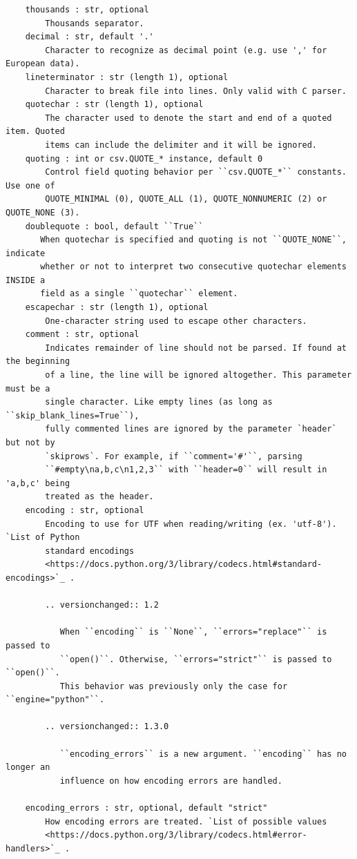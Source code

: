 \documentclass[
  letterpaper,
]{book}
\begin{document}
\begin{verbatim}
    thousands : str, optional
        Thousands separator.
    decimal : str, default '.'
        Character to recognize as decimal point (e.g. use ',' for European data).
    lineterminator : str (length 1), optional
        Character to break file into lines. Only valid with C parser.
    quotechar : str (length 1), optional
        The character used to denote the start and end of a quoted item. Quoted
        items can include the delimiter and it will be ignored.
    quoting : int or csv.QUOTE_* instance, default 0
        Control field quoting behavior per ``csv.QUOTE_*`` constants. Use one of
        QUOTE_MINIMAL (0), QUOTE_ALL (1), QUOTE_NONNUMERIC (2) or QUOTE_NONE (3).
    doublequote : bool, default ``True``
       When quotechar is specified and quoting is not ``QUOTE_NONE``, indicate
       whether or not to interpret two consecutive quotechar elements INSIDE a
       field as a single ``quotechar`` element.
    escapechar : str (length 1), optional
        One-character string used to escape other characters.
    comment : str, optional
        Indicates remainder of line should not be parsed. If found at the beginning
        of a line, the line will be ignored altogether. This parameter must be a
        single character. Like empty lines (as long as ``skip_blank_lines=True``),
        fully commented lines are ignored by the parameter `header` but not by
        `skiprows`. For example, if ``comment='#'``, parsing
        ``#empty\na,b,c\n1,2,3`` with ``header=0`` will result in 'a,b,c' being
        treated as the header.
    encoding : str, optional
        Encoding to use for UTF when reading/writing (ex. 'utf-8'). `List of Python
        standard encodings
        <https://docs.python.org/3/library/codecs.html#standard-encodings>`_ .

        .. versionchanged:: 1.2

           When ``encoding`` is ``None``, ``errors="replace"`` is passed to
           ``open()``. Otherwise, ``errors="strict"`` is passed to ``open()``.
           This behavior was previously only the case for ``engine="python"``.

        .. versionchanged:: 1.3.0

           ``encoding_errors`` is a new argument. ``encoding`` has no longer an
           influence on how encoding errors are handled.

    encoding_errors : str, optional, default "strict"
        How encoding errors are treated. `List of possible values
        <https://docs.python.org/3/library/codecs.html#error-handlers>`_ .


\end{verbatim}
\end{document}
